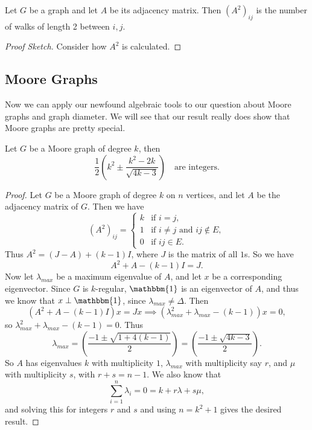 \begin{proposition}
	Let $G$ be a graph and let $A$ be its adjacency matrix. Then $(A^2)_{ij}$ is the number of walks of length 2 between $i, j$.
\end{proposition}
\begin{proof}[Proof Sketch]
Consider how $A^2$ is calculated.	
\end{proof}

\subsection{Moore Graphs}

Now we can apply our newfound algebraic tools to our question about Moore graphs and graph diameter. We will see that our result really does show that Moore graphs are pretty special.

\begin{lemma}
	Let $G$ be a Moore graph of degree $k$, then
	$$
	\frac{1}{2}\left(k^{2} \pm \frac{k^{2}-2 k}{\sqrt{4 k-3}}\right) \quad \text{are integers.}
	$$
\end{lemma}
\begin{proof}
	Let $G$ be a Moore graph of degree $k$ on $n$ vertices, and let $A$ be the adjacency matrix of $G$. Then we have
	$$
	(A^2)_{ij} = \begin{cases}
		k &\mbox{if } i = j, \\
		1 &\mbox{if } i \neq j\text{ and $ij \not \in E$},\\
		0 &\mbox{if } i j \in E.
	   \end{cases}
	$$
	Thus $A^2 = (J - A) + (k - 1)I$, where $J$ is the matrix of all $1$s. So we have
	$$
A^2 + A - (k - 1)I = J.
	$$
	Now let $\lambda_{max}$ be a maximum eigenvalue of $A$, and let $x$ be a corresponding eigenvector. Since $G$ is $k$-regular, $\mathbbm{1}$ is an eigenvector of $A$, and thus we know that $x \perp \mathbbm{1}$, since $\lambda_{max} \neq \Delta$. Then
	$$
	   (A^2 + A - (k - 1)I)x = Jx \implies (\lambda_{max}^2 + \lambda_{max} - (k - 1))x = 0,
	$$
	so $\lambda_{max}^2 + \lambda_{max} - (k - 1) = 0$. Thus
	$$
	   \lambda_{max} = \left(\frac{-1 \pm \sqrt{1+4(k-1)}}{2}\right)=\left(\frac{-1 \pm\sqrt{4 k-3}}{2}\right).
	$$
	So $A$ has eigenvalues $k$ with multiplicity $1$, $\lambda_{max}$ with multiplicity say $r$, and $\mu$ with multiplicity $s$, with $r + s = n - 1$. We also know that
	$$
	   \sum_{i = 1}^n \lambda_i = 0 = k + r\lambda + s\mu,
	$$
	and solving this for integers $r$ and $s$ and using $n = k^2 + 1$ gives the desired result.
\end{proof}

